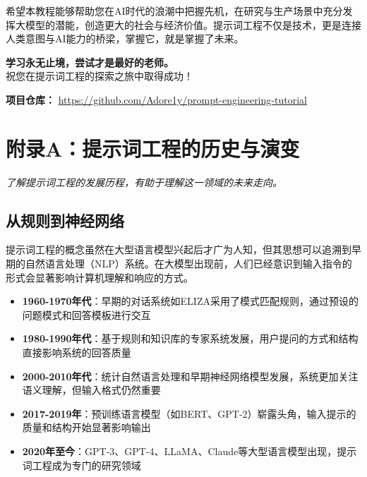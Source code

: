 \documentclass[12pt]{ctexart}
\newcommand{\chapternote}[1]{\vspace{-0.3cm}\par\noindent\textit{\small #1}\vspace{0.3cm}}
\begin{document}
希望本教程能够帮助您在AI时代的浪潮中把握先机，在研究与生产场景中充分发挥大模型的潜能，创造更大的社会与经济价值。提示词工程不仅是技术，更是连接人类意图与AI能力的桥梁，掌握它，就是掌握了未来。

\begin{center}
\textbf{学习永无止境，尝试才是最好的老师。}\\
祝您在提示词工程的探索之旅中取得成功！
\end{center}

\vspace{1cm}
\noindent\textbf{项目仓库：} \url{https://github.com/Adore1y/prompt-engineering-tutorial}


\vspace{0.5cm}
\begin{center}
\end{center}

\section{附录A：提示词工程的历史与演变}
\chapternote{了解提示词工程的发展历程，有助于理解这一领域的未来走向。}

\subsection{从规则到神经网络}
提示词工程的概念虽然在大型语言模型兴起后才广为人知，但其思想可以追溯到早期的自然语言处理（NLP）系统。在大模型出现前，人们已经意识到输入指令的形式会显著影响计算机理解和响应的方式。

\begin{itemize}
  \item \textbf{1960-1970年代}：早期的对话系统如ELIZA采用了模式匹配规则，通过预设的问题模式和回答模板进行交互
  \item \textbf{1980-1990年代}：基于规则和知识库的专家系统发展，用户提问的方式和结构直接影响系统的回答质量
  \item \textbf{2000-2010年代}：统计自然语言处理和早期神经网络模型发展，系统更加关注语义理解，但输入格式仍然重要
  \item \textbf{2017-2019年}：预训练语言模型（如BERT、GPT-2）崭露头角，输入提示的质量和结构开始显著影响输出
  \item \textbf{2020年至今}：GPT-3、GPT-4、LLaMA、Claude等大型语言模型出现，提示词工程成为专门的研究领域
\end{itemize}
\end{document}
